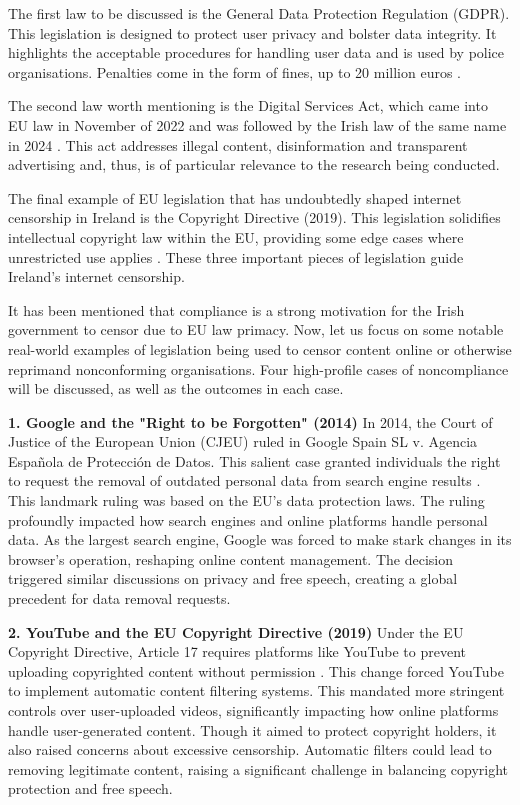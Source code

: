 The first law to be discussed is the General Data Protection Regulation (GDPR). This legislation is designed to protect user privacy and bolster data integrity. It highlights the acceptable procedures for handling user data and is used by police organisations. Penalties come in the form of fines, up to 20 million euros \cite{gdprinfo2025}.

The second law worth mentioning is the Digital Services Act, which came into EU law in November of 2022 and was followed by the Irish law of the same name in 2024 \cite{enterprisegovie2025} \cite{irishstatutebook2024}. This act addresses illegal content, disinformation and transparent advertising and, thus, is of particular relevance to the research being conducted. 

The final example of EU legislation that has undoubtedly shaped internet censorship in Ireland is the Copyright Directive (2019). This legislation solidifies intellectual copyright law within the EU, providing some edge cases where unrestricted use applies \cite{EUCopyright}. These three important pieces of legislation guide Ireland's internet censorship. 

It has been mentioned that compliance is a strong motivation for the Irish government to censor due to EU law primacy. Now, let us focus on some notable real-world examples of legislation being used to censor content online or otherwise reprimand nonconforming organisations. Four high-profile cases of noncompliance will be discussed, as well as the outcomes in each case. 

\textbf{1. Google and the "Right to be Forgotten" (2014)}
In 2014, the Court of Justice of the European Union (CJEU) ruled in Google Spain SL v. Agencia Española de Protección de Datos. This salient case granted individuals the right to request the removal of outdated personal data from search engine results \cite{google2014}. This landmark ruling was based on the EU's data protection laws. The ruling profoundly impacted how search engines and online platforms handle personal data. As the largest search engine, Google was forced to make stark changes in its browser's operation, reshaping online content management. The decision triggered similar discussions on privacy and free speech, creating a global precedent for data removal requests.

\textbf{2. YouTube and the EU Copyright Directive (2019)}
Under the EU Copyright Directive, Article 17 requires platforms like YouTube to prevent uploading copyrighted content without permission \cite{eu2019}. This change forced YouTube to implement automatic content filtering systems. This mandated more stringent controls over user-uploaded videos, significantly impacting how online platforms handle user-generated content. Though it aimed to protect copyright holders, it also raised concerns about excessive censorship. Automatic filters could lead to removing legitimate content, raising a significant challenge in balancing copyright protection and free speech. 

